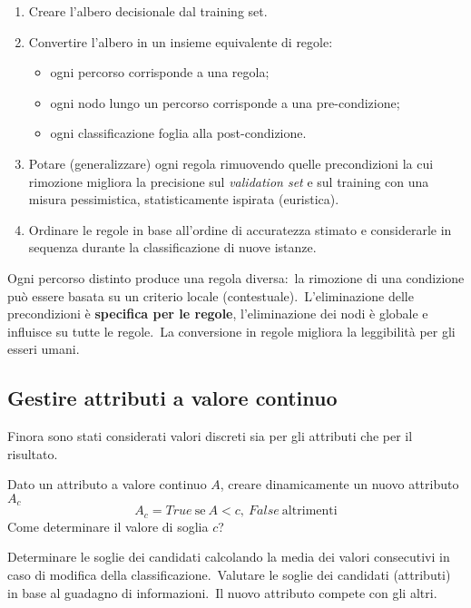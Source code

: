 \begin{enumerate}
	\item Creare l'albero decisionale dal training set.
	\item Convertire l'albero in un insieme equivalente di regole:
	      \begin{itemize}
		      \item ogni percorso corrisponde a una regola;
		      \item ogni nodo lungo un percorso corrisponde a una pre-condizione;
		      \item ogni classificazione foglia alla post-condizione.
	      \end{itemize}
	\item Potare (generalizzare) ogni regola rimuovendo quelle precondizioni la cui rimozione migliora la precisione sul \textit{validation set} e sul training con una misura pessimistica, statisticamente ispirata (euristica).
	\item Ordinare le regole in base all'ordine di accuratezza stimato e considerarle in sequenza durante la classificazione di nuove istanze.
\end{enumerate}

\noindent Ogni percorso distinto produce una regola diversa:\ la rimozione di una condizione può essere basata su un criterio locale (contestuale).\
L'eliminazione delle precondizioni è \textbf{specifica per le regole}, l'eliminazione dei nodi è globale e influisce su tutte le regole.\
La conversione in regole migliora la leggibilità per gli esseri umani.

\subsection{Gestire attributi a valore continuo}

Finora sono stati considerati valori discreti sia per gli attributi che per il risultato.\

\begin{flushleft}
	Dato un attributo a valore continuo $A$, creare dinamicamente un nuovo attributo $A_c$
	\[A_c = \mathit{True}\ \mathrm{se}\ A < c,\ \mathit{False}\ \mathrm{altrimenti}\]
	Come determinare il valore di soglia $c$?
\end{flushleft}

\noindent Determinare le soglie dei candidati calcolando la media dei valori consecutivi in caso di modifica della classificazione.\
Valutare le soglie dei candidati (attributi) in base al guadagno di informazioni.\
Il nuovo attributo compete con gli altri.\

